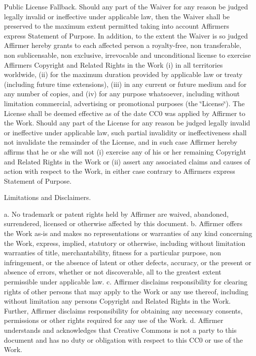 \begin{DoxyEnumerate}
\item Public License Fallback. Should any part of the Waiver for any reason be judged legally invalid or ineffective under applicable law, then the Waiver shall be preserved to the maximum extent permitted taking into account Affirmer\textquotesingle{}s express Statement of Purpose. In addition, to the extent the Waiver is so judged Affirmer hereby grants to each affected person a royalty-\/free, non transferable, non sublicensable, non exclusive, irrevocable and unconditional license to exercise Affirmer\textquotesingle{}s Copyright and Related Rights in the Work (i) in all territories worldwide, (ii) for the maximum duration provided by applicable law or treaty (including future time extensions), (iii) in any current or future medium and for any number of copies, and (iv) for any purpose whatsoever, including without limitation commercial, advertising or promotional purposes (the \char`\"{}\+License\char`\"{}). The License shall be deemed effective as of the date C\+C0 was applied by Affirmer to the Work. Should any part of the License for any reason be judged legally invalid or ineffective under applicable law, such partial invalidity or ineffectiveness shall not invalidate the remainder of the License, and in such case Affirmer hereby affirms that he or she will not (i) exercise any of his or her remaining Copyright and Related Rights in the Work or (ii) assert any associated claims and causes of action with respect to the Work, in either case contrary to Affirmer\textquotesingle{}s express Statement of Purpose.
\item Limitations and Disclaimers.

a. No trademark or patent rights held by Affirmer are waived, abandoned, surrendered, licensed or otherwise affected by this document. b. Affirmer offers the Work as-\/is and makes no representations or warranties of any kind concerning the Work, express, implied, statutory or otherwise, including without limitation warranties of title, merchantability, fitness for a particular purpose, non infringement, or the absence of latent or other defects, accuracy, or the present or absence of errors, whether or not discoverable, all to the greatest extent permissible under applicable law. c. Affirmer disclaims responsibility for clearing rights of other persons that may apply to the Work or any use thereof, including without limitation any person\textquotesingle{}s Copyright and Related Rights in the Work. Further, Affirmer disclaims responsibility for obtaining any necessary consents, permissions or other rights required for any use of the Work. d. Affirmer understands and acknowledges that Creative Commons is not a party to this document and has no duty or obligation with respect to this C\+C0 or use of the Work. 
\end{DoxyEnumerate}